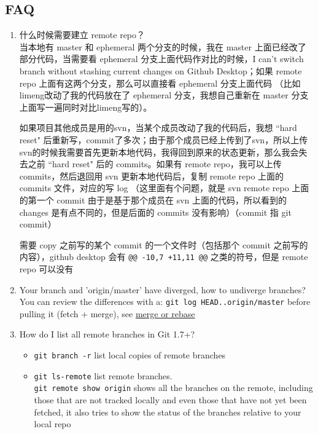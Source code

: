 \documentclass[a4paper, 12pt]{article}
\begin{document}
\subsection{FAQ}
\begin{enumerate}
\item 什么时候需要建立 remote repo？\\
当本地有 master 和 ephemeral 两个分支的时候，我在 master 上面已经改了部分代码，当需要看 ephemeral 分支上面代码作对比的时候，I can't switch branch without stashing current changes on Github Desktop；如果 remote repo 上面有这两个分支，那么可以直接看 ephemeral 分支上面代码 （比如limeng改动了我的代码放在了 ephemeral 分支，我想自己重新在 master 分支上面写一遍同时对比limeng写的）。

如果项目其他成员是用的svn，当某个成员改动了我的代码后，我想 ``hard reset" 后重新写，commit了多次；由于那个成员已经上传到了svn，所以上传svn的时候我需要首先更新本地代码，我得回到原来的状态更新，那么我会失去之前 ``hard reset" 后的 commits。如果有 remote repo，我可以上传 commits，然后退回用 svn 更新本地代码后，复制 remote repo 上面的 commits 文件，对应的写 log （这里面有个问题，就是 svn remote repo 上面的第一个 commit 由于是基于那个成员在 svn 上面的代码，所以看到的 changes 是有点不同的，但是后面的 commits 没有影响）（{\color{red}commit 指 git commit}）

需要 copy 之前写的某个 commit 的一个文件时（包括那个 commit 之前写的内容），github desktop 会有 \verb|@@ -10,7 +11,11 @@| 之类的符号，但是 remote repo 可以没有

\item Your branch and 'origin/master' have diverged, how to undiverge branches?\\
You can review the differences with a: \verb|git log HEAD..origin/master| before pulling it (fetch + merge), see \href{https://stackoverflow.com/questions/2452226/master-branch-and-origin-master-have-diverged-how-to-undiverge-branches}{merge or rebase}

\item How do I list all remote branches in Git 1.7+?
\begin{itemize}
\item \verb|git branch -r| list local copies of remote branches

\item \verb|git ls-remote| list remote branches.\\ \verb|git remote show origin| shows all the branches on the remote, including those that are not tracked locally and even those that have not yet been fetched, it also tries to show the status of the branches relative to your local repo


\end{itemize}
\end{enumerate}
\end{document}
